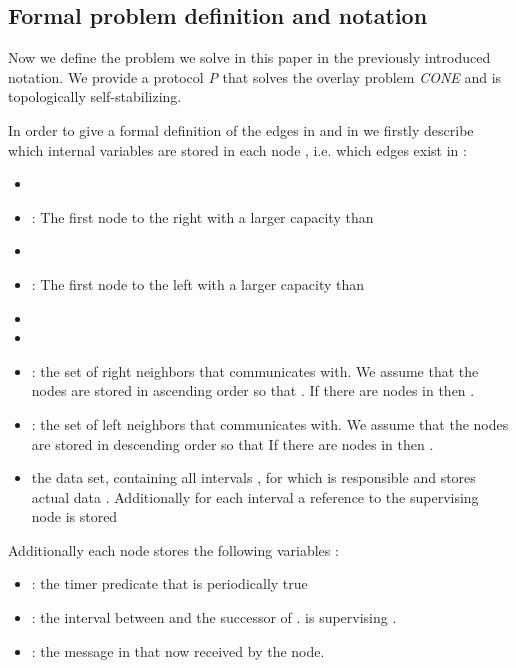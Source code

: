 \documentclass[11pt]{article}
\begin{document}
\subsection{Formal problem definition and notation}\label{problem}



Now we define the problem we solve in this paper in the previously introduced notation. We provide a protocol \emph{P} that solves the overlay problem \emph{CONE} and is topologically self-stabilizing.



In order to give a formal definition of the edges in  and in  we firstly describe which internal variables are stored in each node , i.e. which edges exist in :

\begin{itemize}\itemsep0.1pt

\item 

\item : The first node to the right with a larger capacity than 

\item 

\item : The first node to the left with a larger capacity than 

\item 

\item 

\item : the set of right neighbors that  communicates with. We assume that the nodes are stored in ascending order so that . If there are  nodes in  then . 

\item : the set of left neighbors that  communicates with. We assume that the nodes are stored in descending order so that  If there are  nodes in  then .

\item  the data set, containing all intervals , for which  is responsible and stores actual data .  
Additionally for each interval a reference  to the supervising node is stored
\end{itemize}


Additionally each node stores the following variables :
\begin{itemize}\itemsep0.1pt

\item : the timer predicate that is periodically true

\item : the interval between  and the successor of .  is supervising .

\item : the  message in  that now received by the node.

\end{itemize}
\end{document}
